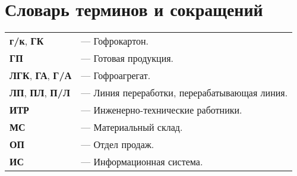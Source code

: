 \section*{Словарь терминов и сокращений}
\noindent

\begin{tabular}{l l}
{\bf г/к}, {\bf ГК}  & --- Гофрокартон.\\
{\bf ГП}  & --- Готовая продукция.\\
{\bf ЛГК}, {\bf ГА}, {\bf Г/А}  & --- Гофроагрегат.\\
{\bf ЛП}, {\bf ПЛ}, {\bf П/Л}  & --- Линия переработки, перерабатывающая линия.\\

{\bf ИТР}  & --- Инженерно-технические работники.\\

{\bf МС}  & --- Материальный склад.\\
{\bf ОП}  & --- Отдел продаж.\\
{\bf ИС}  & --- Информационная система.\\


\end{tabular}
